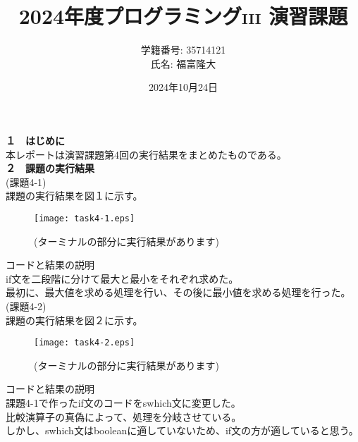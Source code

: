 \documentclass[a4j]{jsarticle}
\title{2024年度プログラミング\textsc{iii} 演習課題}
\author{学籍番号: 35714121 \\ 氏名: 福富隆大}
\date{2024年10月24日}
\begin{document}
\maketitle

\textbf{１　はじめに} \\

本レポートは演習課題第4回の実行結果をまとめたものである。\\

\textbf{２　課題の実行結果} \\

\textmd{(課題4-1)} \\

課題の実行結果を図１に示す。 \\

\begin{figure}[htbp]
  \centering
  \texttt{[image: task4-1.eps]}
  \caption{(ターミナルの部分に実行結果があります)}
  \label{fig:sample}
\end{figure}

\textmd{コードと結果の説明} \\

if文を二段階に分けて最大と最小をそれぞれ求めた。 \\
最初に、最大値を求める処理を行い、その後に最小値を求める処理を行った。 \\

\textmd{(課題4-2)} \\

課題の実行結果を図２に示す。\\

\begin{figure}[htbp]
  \centering
  \texttt{[image: task4-2.eps]}
  \caption{(ターミナルの部分に実行結果があります)}
  \label{fig:sample}
\end{figure}

\textmd{コードと結果の説明} \\
課題4-1で作ったif文のコードをswhich文に変更した。 \\
比較演算子の真偽によって、処理を分岐させている。 \\
しかし、swhich文はbooleanに適していないため、if文の方が適していると思う。 \\
\end{document}

